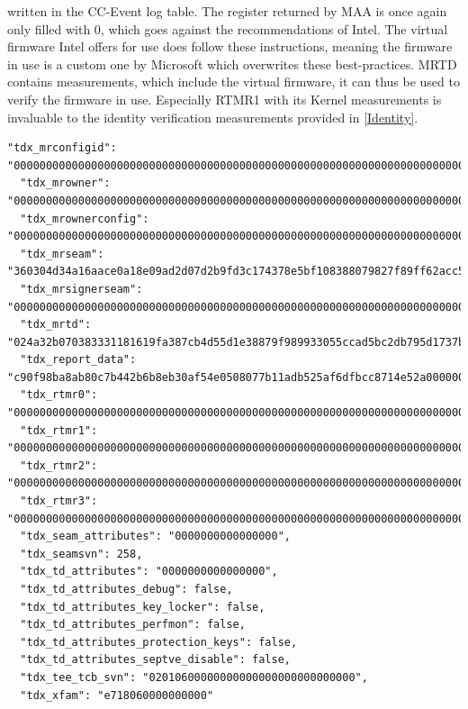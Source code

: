 written in the CC-Event log table. The register returned by MAA is once again only filled with 0, which goes against the recommendations of Intel. The virtual firmware Intel offers for use does follow these instructions, meaning the firmware in use is a custom one by Microsoft which overwrites these best-practices. MRTD contains measurements, which include the virtual firmware, it can thus be used to verify the firmware in use. Especially RTMR1 with its Kernel measurements is invaluable to the identity verification measurements provided in \cref{Identity}.
\begin{lstlisting}[language=jsonmain,caption={TDX generated part of an MAA quote},captionpos=b]
  "tdx_mrconfigid": "000000000000000000000000000000000000000000000000000000000000000000000000000000000000000000000000",
  "tdx_mrowner": "000000000000000000000000000000000000000000000000000000000000000000000000000000000000000000000000",
  "tdx_mrownerconfig": "000000000000000000000000000000000000000000000000000000000000000000000000000000000000000000000000",
  "tdx_mrseam": "360304d34a16aace0a18e09ad2d07d2b9fd3c174378e5bf108388079827f89ff62acc5f8c473dd40706324834e202946",
  "tdx_mrsignerseam": "000000000000000000000000000000000000000000000000000000000000000000000000000000000000000000000000",
  "tdx_mrtd": "024a32b070383331181619fa387cb4d55d1e38879f989933055ccad5bc2db795d1737b66205949d15469dc8c1ba7ab7b",
  "tdx_report_data": "c90f98ba8ab80c7b442b6b8eb30af54e0508077b11adb525af6dfbcc8714e52a0000000000000000000000000000000000000000000000000000000000000000",
  "tdx_rtmr0": "000000000000000000000000000000000000000000000000000000000000000000000000000000000000000000000000",
  "tdx_rtmr1": "000000000000000000000000000000000000000000000000000000000000000000000000000000000000000000000000",
  "tdx_rtmr2": "000000000000000000000000000000000000000000000000000000000000000000000000000000000000000000000000",
  "tdx_rtmr3": "000000000000000000000000000000000000000000000000000000000000000000000000000000000000000000000000",
  "tdx_seam_attributes": "0000000000000000",
  "tdx_seamsvn": 258,
  "tdx_td_attributes": "0000000000000000",
  "tdx_td_attributes_debug": false,
  "tdx_td_attributes_key_locker": false,
  "tdx_td_attributes_perfmon": false,
  "tdx_td_attributes_protection_keys": false,
  "tdx_td_attributes_septve_disable": false,
  "tdx_tee_tcb_svn": "02010600000000000000000000000000",
  "tdx_xfam": "e718060000000000"
\end{lstlisting}
\label{td_quote}


